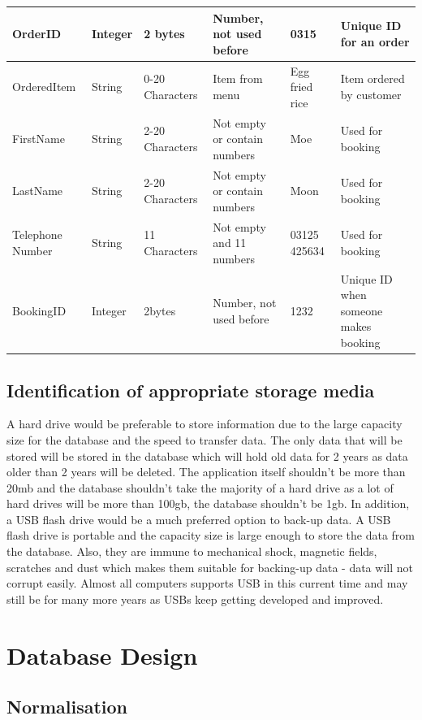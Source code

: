 \begin{center}
\begin{longtable}{ | p{2cm}| p{1cm} | p{1cm} | p{2cm} | p{1cm} | p{3cm} | }
    OrderID & Integer & 2 bytes & Number, not used before & 0315 & Unique ID for an order \\ \hline
    OrderedItem &String & 0-20 Characters &Item from menu & Egg fried rice & Item ordered by customer \\ \hline
    FirstName & String & 2-20 Characters &Not empty or contain numbers & Moe & Used for booking \\ \hline
    LastName & String & 2-20 Characters &Not empty or contain numbers & Moon & Used for booking \\ \hline
    Telephone Number&String&11 Characters & Not empty and 11 numbers & 03125 425634 & Used for booking \\ \hline
    BookingID & Integer & 2bytes &Number, not used before & 1232 & Unique ID when someone makes booking \\ \hline


\end{longtable}
\label{tab:range_examples}
\end{center}

\subsection{Identification of appropriate storage media}

A hard drive would be preferable to store information due to the large capacity size for the database and the speed to transfer data. The only data that will be stored will be stored in the database which will hold old data for 2 years as data older than 2 years will be deleted. The application itself shouldn't be more than 20mb and the database shouldn't take the majority of a hard drive as a lot of hard drives will be more than 100gb, the database shouldn't be 1gb.  In addition, a USB flash drive would be a much preferred option to back-up data. A USB flash drive is portable and the capacity size is large enough to store the data from the database. Also, they are immune to mechanical shock, magnetic fields, scratches and dust which makes them suitable for backing-up data - data will not corrupt easily. Almost all computers supports USB in this current time and may still be for many more years as USBs keep getting developed and improved.


\section{Database Design}
\subsection{Normalisation}

